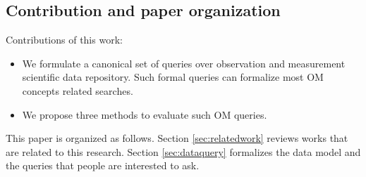 

\subsection{Contribution and paper organization}
Contributions of this work:
\begin{itemize}
\item We formulate a canonical set of queries over observation and
  measurement scientific data repository. Such formal queries can
  formalize most OM concepts related searches. 
\item We propose three methods to evaluate such OM
  queries. 
\end{itemize}

This paper is organized as follows. 
Section \ref{sec:relatedwork} reviews works that are related to this
research. Section \ref{sec:dataquery} formalizes the data model and the
queries that people are interested to ask.  